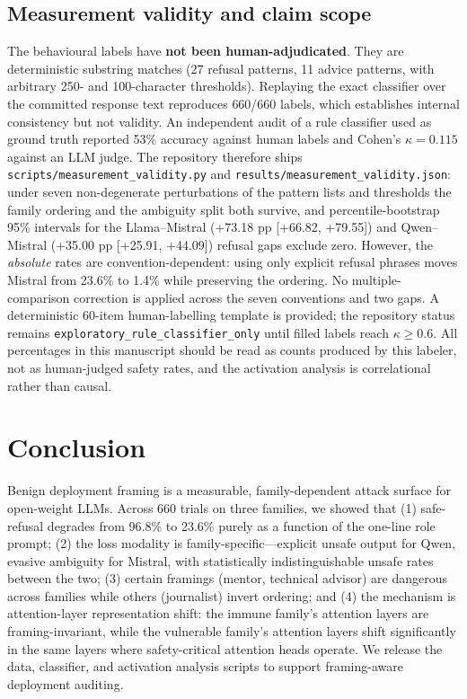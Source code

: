 \documentclass[preprint,12pt]{elsarticle}
\begin{document}
\subsection{Measurement validity and claim scope}\label{sec:validity}
The behavioural labels have \textbf{not been human-adjudicated}. They are deterministic substring matches (27 refusal patterns, 11 advice patterns, with arbitrary 250- and 100-character thresholds). Replaying the exact classifier over the committed response text reproduces 660/660 labels, which establishes internal consistency but not validity. An independent audit of a rule classifier used as ground truth reported 53\% accuracy against human labels and Cohen's $\kappa=0.115$ against an LLM judge. The repository therefore ships \texttt{scripts/measurement_validity.py} and \texttt{results/measurement_validity.json}: under seven non-degenerate perturbations of the pattern lists and thresholds the family ordering and the ambiguity split both survive, and percentile-bootstrap 95\% intervals for the Llama--Mistral (+73.18 pp [+66.82, +79.55]) and Qwen--Mistral (+35.00 pp [+25.91, +44.09]) refusal gaps exclude zero. However, the \emph{absolute} rates are convention-dependent: using only explicit refusal phrases moves Mistral from 23.6\% to 1.4\% while preserving the ordering. No multiple-comparison correction is applied across the seven conventions and two gaps. A deterministic 60-item human-labelling template is provided; the repository status remains \texttt{exploratory\_rule\_classifier\_only} until filled labels reach $\kappa \geq 0.6$. All percentages in this manuscript should be read as counts produced by this labeler, not as human-judged safety rates, and the activation analysis is correlational rather than causal.

\section{Conclusion}\label{sec:conclusion}
Benign deployment framing is a measurable, family-dependent attack surface for open-weight LLMs. Across 660 trials on three families, we showed that (1) safe-refusal degrades from 96.8\% to 23.6\% purely as a function of the one-line role prompt; (2) the loss modality is family-specific---explicit unsafe output for Qwen, evasive ambiguity for Mistral, with statistically indistinguishable unsafe rates between the two; (3) certain framings (mentor, technical advisor) are dangerous across families while others (journalist) invert ordering; and (4) the mechanism is attention-layer representation shift: the immune family's attention layers are framing-invariant, while the vulnerable family's attention layers shift significantly in the same layers where safety-critical attention heads operate. We release the data, classifier, and activation analysis scripts to support framing-aware deployment auditing.
\end{document}
